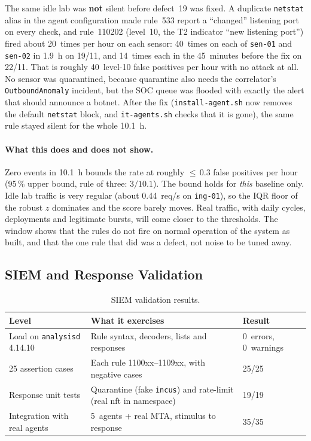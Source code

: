 \documentclass[11pt,a4paper]{article}
\begin{document}
The same idle lab was \textbf{not} silent before defect~19 was fixed. A duplicate
\texttt{netstat} alias in the agent configuration made rule~533 report a ``changed'' listening
port on every check, and rule~110202 (level~10, the T2 indicator ``new listening port'')
fired about 20~times per hour on each sensor: 40~times on each of \texttt{sen-01} and
\texttt{sen-02} in 1.9~h on 19/11, and 14~times each in the 45~minutes before the fix on
22/11. That is roughly 40~level-10 false positives per hour with no attack at all. No sensor
was quarantined, because quarantine also needs the correlator's \texttt{OutboundAnomaly}
incident, but the SOC queue was flooded with exactly the alert that should announce a botnet.
After the fix (\texttt{install-agent.sh} now removes the default \texttt{netstat} block, and
\texttt{it-agents.sh} checks that it is gone), the same rule stayed silent for the whole 10.1~h.

\paragraph{What this does and does not show.} Zero events in 10.1~h bounds the rate at
roughly ${\leq}\,0.3$ false positives per hour (95\,\% upper bound, rule of three: $3/10.1$).
The bound holds for \emph{this} baseline only. Idle lab traffic is very regular (about
0.44~req/s on \texttt{ing-01}), so the IQR floor of the robust $z$ dominates and the score barely
moves. Real traffic, with daily cycles, deployments and legitimate bursts, will come closer to
the thresholds. The window shows that the rules do not fire on normal operation of the system
as built, and that the one rule that did was a defect, not noise to be tuned away.

\subsection{SIEM and Response Validation}

\begin{table}[H]
  \centering
  \caption{SIEM validation results.}
  \begin{tabular}{@{}p{3.5cm}p{5cm}p{4cm}@{}}
    \toprule
    \textbf{Level} & \textbf{What it exercises} & \textbf{Result} \\
    \midrule
    Load on \texttt{analysisd} 4.14.10 &
      Rule syntax, decoders, lists and responses & 0~errors, 0~warnings \\
    25 assertion cases &
      Each rule 1100xx--1109xx, with negative cases & 25/25 \\
    Response unit tests &
      Quarantine (fake \texttt{incus}) and rate-limit (real nft in namespace) & 19/19 \\
    Integration with real agents &
      5~agents + real MTA, stimulus to response & 35/35 \\
    \bottomrule
  \end{tabular}
\end{table}
\end{document}
